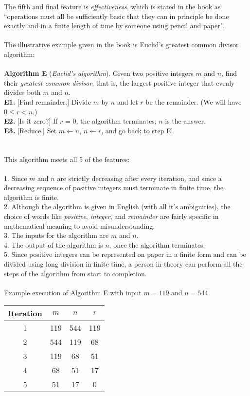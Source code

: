 \documentclass[12pt]{article}
\newenvironment{problem}[2][Problem]{\begin{trivlist}
\item[\hskip \labelsep {\bfseries #1}\hskip \labelsep {\bfseries #2.}]}{\end{trivlist}}
\begin{document}
\begin{problem}{1}
 The fifth and final feature is \emph{effectiveness}, which is stated in the book as ``operations must all be sufficiently basic that they can in principle be done exactly and in a finite length of time by someone using pencil and paper".\\\\
 The illustrative example given in the book is Euclid's greatest common divisor algorithm:\\\\
 \textbf{Algorithm E} (\emph{Euclid's algorithm}). Given two positive integers $m$ and $n$, find
their \emph{greatest common divisor}, that is, the largest positive integer that evenly
divides both $m$ and $n$.\\
\textbf{E1.} [Find remainder.] Divide $m$ by $n$ and let $r$ be the remainder. (We will have
$0 \leq r < n$.)\\
\textbf{E2.}  [Is it zero?] If $r$ = 0, the algorithm terminates; $n$ is the answer.\\
\textbf{E3.} [Reduce.] Set $m \leftarrow n$, $n \leftarrow r$, and go back to step El.
\\\\\\
This algorithm meets all 5 of the features:\\\\
1. Since $m$ and $n$ are strictly decreasing after every iteration, and since a decreasing sequence of positive integers must terminate in finite time, the algorithm is finite.\\
2. Although the algorithm is given in English (with all it's ambiguities), the choice of words like \emph{positive}, \emph{integer}, and \emph{remainder} are fairly specific in mathematical meaning to avoid misunderstanding.\\
3. The inputs for the algorithm are $m$ and $n$.\\
4. The output of the algorithm is $n$, once the algorithm terminates.\\
5. Since positive integers can be represented on paper in a finite form and can be divided using long division in finite time, a person in theory can perform all the steps of the algorithm from start to completion.
\\\\
Example execution of Algorithm E with input $m = 119$ and $n = 544$
\begin{center}
\begin{tabular}{|c c c c|} 
 \hline
 Iteration & $m$ & $n$ & $r$ \\
 \hline
 1 & 119 & 544 & 119 \\ 
 2 & 544 & 119 & 68 \\
 3 & 119 & 68 & 51 \\
 4 & 68 & 51 & 17 \\
 5 & 51 & 17 & 0 \\
 \hline
\end{tabular}
\end{center}
 
 \end{problem}
 
 
\end{document}
